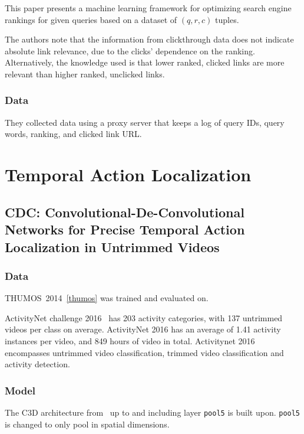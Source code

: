 \documentclass[a4paper, 12pt]{article}
\begin{document}
This paper presents a machine learning framework for optimizing search engine
rankings for given queries based on a dataset of $(q, r, c)$ tuples.

The authors note that the information from clickthrough data does not indicate
absolute link relevance, due to the clicks' dependence on the ranking.
Alternatively, the knowledge used is that lower ranked, clicked links are more
relevant than higher ranked, unclicked links.


\subsubsection{Data}

They collected data using a proxy server that keeps a log of query IDs, query
words, ranking, and clicked link URL.


\section{Temporal Action Localization}


\subsection{CDC\@: Convolutional-De-Convolutional Networks for Precise Temporal
            Action Localization in Untrimmed
            Videos~\citet{DBLP:journals/corr/ShouCZMC17}}

\subsubsection{Data}

THUMOS~2014~\ref{thumos} was trained and evaluated on.

ActivityNet challenge 2016~\citet{Heilbron_2015_CVPR} has 203 activity
categories, with 137 untrimmed videos per class on average. ActivityNet 2016
has an average of 1.41 activity instances per video, and 849 hours of video in
total. Activitynet 2016 encompasses untrimmed video classification, trimmed
video classification and activity detection.

\subsubsection{Model}

The C3D architecture
from~\citet{DBLP:journals/corr/TranBFTP15, DBLP:journals/corr/TranBFTP14} up to
and including layer \verb|pool5| is built upon. \verb|pool5| is changed to only
pool in spatial dimensions.
\end{document}
